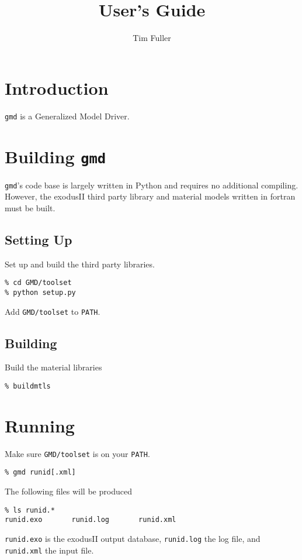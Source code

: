 \documentclass[11pt]{report}
\title{\gmd{} User's Guide}
\author{Tim Fuller}
\newcommand{\gmd}{\texttt{gmd}}
\begin{document}
\maketitle

\chapter{Introduction}
\gmd{} is a Generalized Model Driver.

\chapter{Building \gmd}
\gmd's code base is largely written in Python and requires no additional
compiling.  However, the exodusII third party library and material models
written in fortran must be built.

\section{Setting Up}
Set up and build the third party libraries.
\begin{verbatim}
% cd GMD/toolset
% python setup.py
\end{verbatim}

Add \texttt{GMD/toolset} to \texttt{PATH}.

\section{Building}
Build the material libraries
\begin{verbatim}
% buildmtls
\end{verbatim}

\chapter{Running}
Make sure \texttt{GMD/toolset} is on your \texttt{PATH}.
\begin{verbatim}
% gmd runid[.xml]
\end{verbatim}

The following files will be produced
\begin{verbatim}
% ls runid.*
runid.exo       runid.log       runid.xml
\end{verbatim}
%
\texttt{runid.exo} is the exodusII output database, \texttt{runid.log} the log
file, and \texttt{runid.xml} the input file.
\end{document}
